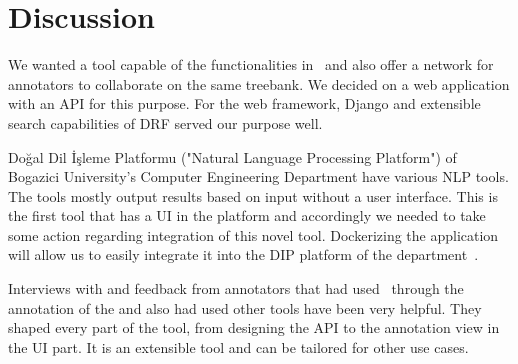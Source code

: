 \section{Discussion}
\label{sec:discussion}

We wanted a tool capable of the functionalities in \boatvone\ and also offer a network for annotators to collaborate on the same treebank.
We decided on a web application with an API for this purpose.
For the web framework, Django and extensible search capabilities of DRF served our purpose well.

Doğal Dil İşleme Platformu ("Natural Language Processing Platform") of Bogazici University's Computer Engineering Department have various NLP tools.
The tools mostly output results based on input without a user interface.
This is the first tool that has a UI in the platform and accordingly we needed to take some action regarding integration of this novel tool.
Dockerizing the application will allow us to easily integrate it into the DIP platform of the department~\cite{DIP}.

Interviews with and feedback from annotators that had used \boatvone\ through the annotation of the \bountreebank{} and also had used other tools have been very helpful.
They shaped every part of the tool, from designing the API to the annotation view in the UI part.
It is an extensible tool and can be tailored for other use cases.
